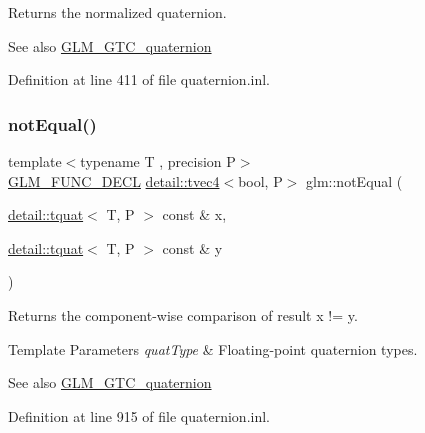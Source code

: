 Returns the normalized quaternion.

\begin{DoxySeeAlso}{See also}
\hyperlink{group__gtc__quaternion}{G\+L\+M\+\_\+\+G\+T\+C\+\_\+quaternion} 
\end{DoxySeeAlso}


Definition at line 411 of file quaternion.\+inl.

\mbox{\label{group__gtc__quaternion_gaa3a8cf1aa580e435ca96acafbd7870a5}} 
\subsubsection{\texorpdfstring{not\+Equal()}{notEqual()}}
{\footnotesize\ttfamily template$<$typename T , precision P$>$ \\
\hyperlink{setup_8hpp_ab2d052de21a70539923e9bcbf6e83a51}{G\+L\+M\+\_\+\+F\+U\+N\+C\+\_\+\+D\+E\+CL} \hyperlink{structglm_1_1detail_1_1tvec4}{detail\+::tvec4}$<$bool, P$>$ glm\+::not\+Equal (\begin{DoxyParamCaption}\item[{\hyperlink{structglm_1_1detail_1_1tquat}{detail\+::tquat}$<$ T, P $>$ const \&}]{x,  }\item[{\hyperlink{structglm_1_1detail_1_1tquat}{detail\+::tquat}$<$ T, P $>$ const \&}]{y }\end{DoxyParamCaption})}

Returns the component-\/wise comparison of result x != y.


\begin{DoxyTemplParams}{Template Parameters}
{\em quat\+Type} & Floating-\/point quaternion types.\\
\hline
\end{DoxyTemplParams}
\begin{DoxySeeAlso}{See also}
\hyperlink{group__gtc__quaternion}{G\+L\+M\+\_\+\+G\+T\+C\+\_\+quaternion} 
\end{DoxySeeAlso}


Definition at line 915 of file quaternion.\+inl.

\mbox{\label{group__gtc__quaternion_ga4d345dc369a54f53f5ebc375bac56d11}} 
